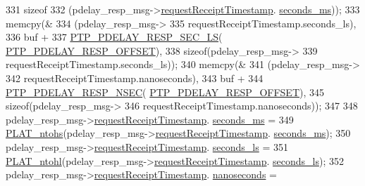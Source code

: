 \begin{DoxyCode}
{{{{{{{{331                    \textcolor{keyword}{sizeof}
332                    (pdelay\_resp\_msg->\hyperlink{class_p_t_p_message_path_delay_resp_a981c3fe148ecddf9f1091675650ccd48}{requestReceiptTimestamp}.
      \hyperlink{class_timestamp_a5d98378d782519e6f9c17db70f1620f0}{seconds\_ms}));
333             memcpy(&
334                    (pdelay\_resp\_msg->
335                 requestReceiptTimestamp.seconds\_ls),
336                    buf +
337                    \hyperlink{avbts__message_8hpp_a8a6d2e369c19399ba34d40de83e3d318}{PTP\_PDELAY\_RESP\_SEC\_LS}(
      \hyperlink{avbts__message_8hpp_a7c20f0e32d4408c124fa9e115ab32cf3}{PTP\_PDELAY\_RESP\_OFFSET}),
338                    \textcolor{keyword}{sizeof}(pdelay\_resp\_msg->
339                       requestReceiptTimestamp.seconds\_ls));
340             memcpy(&
341                    (pdelay\_resp\_msg->
342                 requestReceiptTimestamp.nanoseconds),
343                    buf +
344                    \hyperlink{avbts__message_8hpp_aa670bfeed173fa1a7937337fb6210f69}{PTP\_PDELAY\_RESP\_NSEC}(
      \hyperlink{avbts__message_8hpp_a7c20f0e32d4408c124fa9e115ab32cf3}{PTP\_PDELAY\_RESP\_OFFSET}),
345                    \textcolor{keyword}{sizeof}(pdelay\_resp\_msg->
346                       requestReceiptTimestamp.nanoseconds));
347 
348             pdelay\_resp\_msg->\hyperlink{class_p_t_p_message_path_delay_resp_a981c3fe148ecddf9f1091675650ccd48}{requestReceiptTimestamp}.
      \hyperlink{class_timestamp_a5d98378d782519e6f9c17db70f1620f0}{seconds\_ms} =
349                 \hyperlink{linux_2src_2platform_8cpp_a6b8f3e7b87b66fa774a07ddc67f883a7}{PLAT\_ntohs}(pdelay\_resp\_msg->\hyperlink{class_p_t_p_message_path_delay_resp_a981c3fe148ecddf9f1091675650ccd48}{requestReceiptTimestamp}.
      \hyperlink{class_timestamp_a5d98378d782519e6f9c17db70f1620f0}{seconds\_ms});
350             pdelay\_resp\_msg->\hyperlink{class_p_t_p_message_path_delay_resp_a981c3fe148ecddf9f1091675650ccd48}{requestReceiptTimestamp}.
      \hyperlink{class_timestamp_a2bf200e58cd268d8b86cf93c51500a44}{seconds\_ls} =
351                 \hyperlink{linux_2src_2platform_8cpp_ad335681c3444e0406899693a6f782173}{PLAT\_ntohl}(pdelay\_resp\_msg->\hyperlink{class_p_t_p_message_path_delay_resp_a981c3fe148ecddf9f1091675650ccd48}{requestReceiptTimestamp}.
      \hyperlink{class_timestamp_a2bf200e58cd268d8b86cf93c51500a44}{seconds\_ls});
352             pdelay\_resp\_msg->\hyperlink{class_p_t_p_message_path_delay_resp_a981c3fe148ecddf9f1091675650ccd48}{requestReceiptTimestamp}.
      \hyperlink{class_timestamp_a78ae11d98fcfe738239d0a853d82c84a}{nanoseconds} =
}}}}}}}}
\end{DoxyCode}
